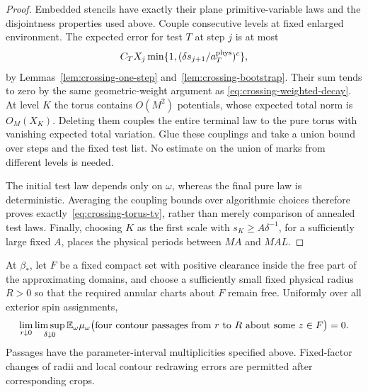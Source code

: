 \begin{proof}
Embedded stencils have exactly their plane primitive-variable laws and
the disjointness properties used above.  Couple consecutive levels at
fixed enlarged environment.  The expected error for test $T$ at step
$j$ is at most
\[
 C_TX_j\min\{1,(\delta s_{j+1}/a_T^{\rm phys})^c\},
\]
by Lemmas~\ref{lem:crossing-one-step} and~\ref{lem:crossing-bootstrap}.
Their sum tends to zero by the same geometric-weight argument as
\eqref{eq:crossing-weighted-decay}.  At level $K$ the torus contains
$O(M^2)$ potentials, whose expected total norm is $O_M(X_K)$.
Deleting them couples the entire terminal law to the pure torus with
vanishing expected total variation.  Glue these couplings and take a
union bound over steps and the fixed test list.  No estimate on the union
of marks from different levels is needed.

The initial test law depends only on $\omega$, whereas the final pure
law is deterministic.  Averaging the coupling bounds over algorithmic
choices therefore proves exactly~\eqref{eq:crossing-torus-tv}, rather
than merely comparison of annealed test laws.  Finally, choosing $K$ as
the first scale with $s_K\geq A\delta^{-1}$, for a sufficiently large
fixed $A$, places the physical periods between $MA$ and $MAL$.
\end{proof}

\begin{corollary}
\label{cor:four-passages}
At $\beta_*$, let $F$ be a fixed compact set with positive clearance
inside the free part of the approximating domains, and choose a
sufficiently small fixed physical radius $R>0$ so that the required
annular charts about $F$ remain free.  Uniformly over all exterior spin
assignments,
\begin{equation}
 \lim_{r\downarrow0}\limsup_{\delta\downarrow0}
 \mathbb E_{\omega}\mu_{\omega}\bigl(
 \text{four contour passages from }r\text{ to }R
                       \text{ about some }z\in F\bigr)=0.
 \label{eq:crossing-four-passages}
\end{equation}
Passages have the parameter-interval multiplicities specified above.
Fixed-factor changes of radii and local contour redrawing errors are
permitted after corresponding crops.
\end{corollary}

